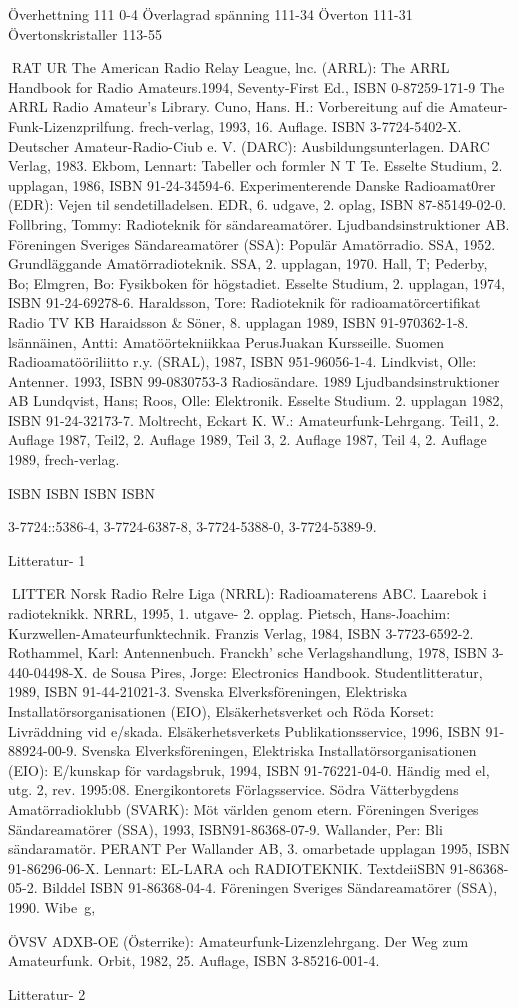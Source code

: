Överhettning 111 0-4
Överlagrad spänning 111-34
Överton 111-31
Övertonskristaller 113-55

RAT UR
The American Radio Relay League, lnc. (ARRL):
The ARRL Handbook for Radio Amateurs.1994, Seventy-First Ed., ISBN 0-87259-171-9
The ARRL Radio Amateur's Library.
Cuno, Hans. H.:
Vorbereitung auf die Amateur-Funk-Lizenzprilfung.
frech-verlag, 1993, 16. Auflage. ISBN 3-7724-5402-X.
Deutscher Amateur-Radio-Ciub e. V. (DARC):
Ausbildungsunterlagen.
DARC Verlag, 1983.
Ekbom, Lennart:
Tabeller och formler N T Te.
Esselte Studium, 2. upplagan, 1986, ISBN 91-24-34594-6.
Experimenterende Danske Radioamat0rer (EDR):
Vejen til sendetilladelsen.
EDR, 6. udgave, 2. oplag, ISBN 87-85149-02-0.
Follbring, Tommy:
Radioteknik för sändareamatörer.
Ljudbandsinstruktioner AB.
Föreningen Sveriges Sändareamatörer (SSA):
Populär Amatörradio. SSA, 1952.
Grundläggande Amatörradioteknik. SSA, 2. upplagan, 1970.
Hall, T; Pederby, Bo; Elmgren, Bo:
Fysikboken för högstadiet.
Esselte Studium, 2. upplagan, 1974, ISBN 91-24-69278-6.
Haraldsson, Tore:
Radioteknik för radioamatörcertifikat
Radio TV KB Haraidsson \& Söner, 8. upplagan 1989, ISBN 91-970362-1-8.
lsännäinen, Antti:
Amatöörtekniikkaa PerusJuakan Kursseille.
Suomen Radioamatööriliitto r.y. (SRAL), 1987, ISBN 951-96056-1-4.
Lindkvist, Olle:
Antenner. 1993, ISBN 99-0830753-3
Radiosändare. 1989
Ljudbandsinstruktioner AB
Lundqvist, Hans; Roos, Olle:
Elektronik.
Esselte Studium. 2. upplagan 1982, ISBN 91-24-32173-7.
Moltrecht, Eckart K. W.:
Amateurfunk-Lehrgang.
Teil1, 2. Auflage 1987,
Teil2, 2. Auflage 1989,
Teil 3, 2. Auflage 1987,
Teil 4, 2. Auflage 1989,
frech-verlag.

ISBN
ISBN
ISBN
ISBN

3-7724::5386-4,
3-7724-6387-8,
3-7724-5388-0,
3-7724-5389-9.

Litteratur- 1

LITTER
Norsk Radio Relre Liga (NRRL):
Radioamaterens ABC. Laarebok i radioteknikk.
NRRL, 1995, 1. utgave- 2. opplag.
Pietsch, Hans-Joachim:
Kurzwellen-Amateurfunktechnik.
Franzis Verlag, 1984, ISBN 3-7723-6592-2.
Rothammel, Karl:
Antennenbuch.
Franckh' sche Verlagshandlung, 1978, ISBN 3-440-04498-X.
de Sousa Pires, Jorge:
Electronics Handbook.
Studentlitteratur, 1989, ISBN 91-44-21021-3.
Svenska Elverksföreningen, Elektriska Installatörsorganisationen (EIO), Elsäkerhetsverket
och Röda Korset:
Livräddning vid e/skada.
Elsäkerhetsverkets Publikationsservice, 1996, ISBN 91-88924-00-9.
Svenska Elverksföreningen, Elektriska Installatörsorganisationen (EIO):
E/kunskap för vardagsbruk, 1994, ISBN 91-76221-04-0.
Händig med el, utg. 2, rev. 1995:08.
Energikontorets Förlagsservice.
Södra Vätterbygdens Amatörradioklubb (SVARK):
Möt världen genom etern.
Föreningen Sveriges Sändareamatörer (SSA), 1993, ISBN91-86368-07-9.
Wallander, Per:
Bli sändaramatör.
PERANT Per Wallander AB, 3. omarbetade upplagan 1995, ISBN 91-86296-06-X.
Lennart:
EL-LARA och RADIOTEKNIK.
TextdeiiSBN 91-86368-05-2.
Bilddel ISBN 91-86368-04-4.
Föreningen Sveriges Sändareamatörer (SSA), 1990.
Wibe~g,

ÖVSV ADXB-OE (Österrike):
Amateurfunk-Lizenzlehrgang. Der Weg zum Amateurfunk.
Orbit, 1982, 25. Auflage, ISBN 3-85216-001-4.

Litteratur- 2
